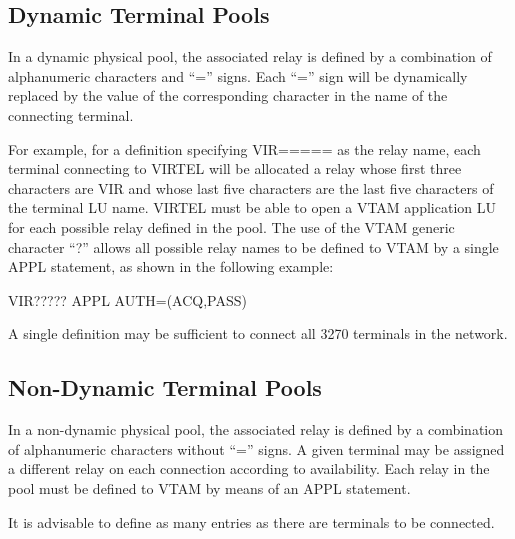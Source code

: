 \documentclass[letterpaper,10pt,english]{sphinxmanual}
\begin{document}

\subsection{Dynamic Terminal Pools}
\label{\detokenize{connectivity_guide:dynamic-terminal-pools}}\label{\detokenize{connectivity_guide:index-140}}
In a dynamic physical pool, the associated relay is defined by a combination of alphanumeric characters and “=” signs. Each “=” sign will be dynamically replaced by the value of the corresponding character in the name of the connecting
terminal.

For example, for a definition specifying VIR===== as the relay name, each terminal connecting to VIRTEL will be allocated a relay whose first three characters are VIR and whose last five characters are the last five characters of the terminal LU name. VIRTEL must be able to open a VTAM application LU for each possible relay defined in the pool. The use of the VTAM generic character “?” allows all possible relay names to be defined to VTAM by a single APPL statement, as shown in the following example:

\begin{sphinxVerbatim}[commandchars=\\\{\}]
VIR????? APPL AUTH=(ACQ,PASS)
\end{sphinxVerbatim}

A single definition may be sufficient to connect all 3270 terminals in the network.


\subsection{Non-Dynamic Terminal Pools}
\label{\detokenize{connectivity_guide:non-dynamic-terminal-pools}}\label{\detokenize{connectivity_guide:index-141}}
In a non-dynamic physical pool, the associated relay is defined by a combination of alphanumeric characters without “=” signs. A given terminal may be assigned a different relay on each connection according to availability. Each relay in the pool must be defined to VTAM by means of an APPL statement.

It is advisable to define as many entries as there are terminals to be connected.

\end{document}
